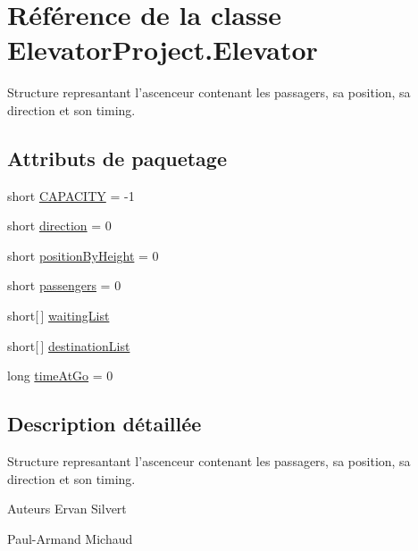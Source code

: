 \hypertarget{classElevatorProject_1_1Elevator}{\section{Référence de la classe Elevator\-Project.\-Elevator}
\label{classElevatorProject_1_1Elevator}
}


Structure represantant l'ascenceur contenant les passagers, sa position, sa direction et son timing.  


\subsection*{Attributs de paquetage}
\begin{DoxyCompactItemize}
\item 
short \hyperlink{classElevatorProject_1_1Elevator_a6b1b4fd53429ce2e9f4047cf026a6218}{C\-A\-P\-A\-C\-I\-T\-Y} = -\/1
\item 
short \hyperlink{classElevatorProject_1_1Elevator_a3b93476cc71554678cba7f56f4615d1e}{direction} = 0
\item 
short \hyperlink{classElevatorProject_1_1Elevator_ab1b368c5ffad580c3693bd7ada72285a}{position\-By\-Height} = 0
\item 
short \hyperlink{classElevatorProject_1_1Elevator_a7e09eed6c6786dc1c184825738724d63}{passengers} = 0
\item 
short\mbox{[}$\,$\mbox{]} \hyperlink{classElevatorProject_1_1Elevator_a1a2cb5a9024a1aa576f3c41637eac36f}{waiting\-List}
\item 
short\mbox{[}$\,$\mbox{]} \hyperlink{classElevatorProject_1_1Elevator_a8e4d006bcb17368a9c3a8c2f18acb91f}{destination\-List}
\item 
long \hyperlink{classElevatorProject_1_1Elevator_a32824d3b94909aeb726937a62ed16775}{time\-At\-Go} = 0
\end{DoxyCompactItemize}


\subsection{Description détaillée}
Structure represantant l'ascenceur contenant les passagers, sa position, sa direction et son timing. 

\begin{DoxyAuthor}{Auteurs}
Ervan Silvert 

Paul-\/\-Armand Michaud 
\end{DoxyAuthor}


